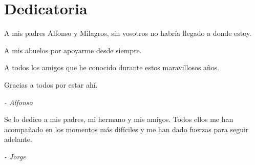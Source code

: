 
\chapter*{Dedicatoria}


\small

\hfill A mis padres Alfonso y Milagros, sin vosotros no habría llegado a donde estoy.

\hfill A mis abuelos por apoyarme desde siempre.

\hfill A todos los amigos que he conocido durante estos maravillosos años.

\hfill Gracias a todos por estar ahí.

\hfill \emph{- Alfonso}

\hfill 

\hfill Se lo dedico a mis padres, mi hermano y mis amigos. Todos ellos me han acompañado en los momentos más difíciles y me han dado fuerzas para seguir adelante.

\hfill \emph{- Jorge}


\thispagestyle{empty}\mbox{}